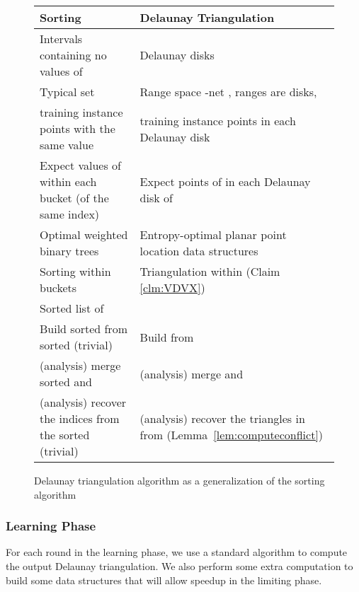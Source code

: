 \documentclass{siamltex}
\begin{document}
\begin{figure}
\begin{center}
\begin{tabular}{|p{170pt}|p{170pt}|}
    
    \hline   Sorting
            & Delaunay Triangulation
    \\ \hline Intervals  containing no values of 
            & Delaunay disks
    \\ \hline Typical set 
            &Range space -net  \cite{MSW,CV}, ranges are disks, 
	    
    \\ \hline  training instance points with the same  value
            &  training instance points in each Delaunay disk
    \\ \hline Expect  values of   within each bucket 
    (of the same  index)
            & Expect  points of  in each Delaunay disk of 
    \\ \hline Optimal weighted binary trees 
            & Entropy-optimal planar point location data structures 
	     \cite{AMM}
    \\ \hline Sorting within buckets
            & Triangulation within  
	    (Claim \ref{clm:VDVX})
    \\ \hline Sorted list of 
            & 
    \\ \hline Build sorted  from sorted  (trivial)
            & Build  from  \cite{CDH+,ChazelleMu09}
    \\ \hline (analysis) merge sorted  and 
            & (analysis) merge  and  \cite{C}
    \\ \hline (analysis) recover the indices  from the sorted  
    (trivial)
            & (analysis) recover the triangles  in  
	    from  (Lemma~\ref{lem:computeconflict})
    \\ \hline
\end{tabular}
\end{center}
\caption{Delaunay triangulation algorithm as a generalization of the 
sorting algorithm}
\label{fig:analogies}
\end{figure}

\subsubsection{Learning Phase}\label{sec:learning}

For each round in the learning phase, we use a standard algorithm
to compute the output Delaunay triangulation. We also
perform some extra computation to build some
data structures that will allow speedup in the limiting phase.
\end{document}
